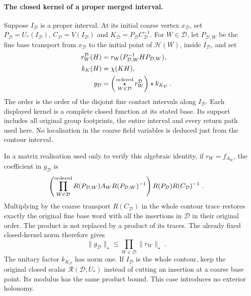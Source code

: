 \documentclass[11pt]{article}
\begin{document}
\paragraph{The closed kernel of a proper merged interval.}
Suppose $I_{\mathcal D}$ is a proper interval. At its initial
coarse vertex $x_{\mathcal D}$, set
$P_{\mathcal D}=U_*(I_{\mathcal D})$,
$C_{\mathcal D}=V(I_{\mathcal D})$ and
$K_{\mathcal D}=P_{\mathcal D}C_{\mathcal D}^{-1}$.
For $W\in\mathcal D$, let $P_{\mathcal D,W}$ be the fine base
transport from $x_{\mathcal D}$ to the initial point of
$\mathcal H(W)$, inside $I_{\mathcal D}$, and set
\begin{equation}\label{eq:c8-fourth-merged-kernel}
    \begin{aligned}
        r_W^{\mathcal D}(H)
            &=r_W(P_{\mathcal D,W}^{-1}HP_{\mathcal D,W}),\\
        k_K(H)&=\chi(KH),\\
        g_{\mathcal D}
            &=\left(\mathop{\star}_{W\in\mathcal D}^{\rm ordered}
                    r_W^{\mathcal D}\right)\star k_{K_{\mathcal D}}\;.
    \end{aligned}
\end{equation}
The order is the order of the disjoint fine contact intervals
along $I_{\mathcal D}$. Each displayed kernel is a complete
closed function at its stated base. Its support includes all
original group footprints, the entire interval and every return
path used here. No localisation in the coarse field variables
is deduced just from the contour interval.

In a matrix realisation used only to verify this algebraic
identity, if $r_W=f_{A_W}$, the coefficient in
$g_{\mathcal D}$ is
\begin{equation}\label{eq:c8-fourth-merged-word}
    \left(\prod_{W\in\mathcal D}^{\rm ordered}
        R(P_{\mathcal D,W})A_WR(P_{\mathcal D,W})^{-1}\right)
        R(P_{\mathcal D})R(C_{\mathcal D})^{-1}\;.
\end{equation}
Multiplying by the coarse transport $R(C_{\mathcal D})$ in the
whole contour trace restores exactly the original fine base
word with all the insertions in $\mathcal D$ in their original
order. The product is not replaced by a product of its traces.
The already fixed closed-kernel norm therefore gives
\begin{equation}\label{eq:c8-fourth-merged-norm}
    \|g_{\mathcal D}\|_\star
        \leq\prod_{W\in\mathcal D}\|r_W\|_\star\;.
\end{equation}
The unitary factor $k_{K_{\mathcal D}}$ has norm one. If
$I_{\mathcal D}$ is the whole contour, keep the original
closed scalar $\mathcal R(\mathcal D;U_*)$ instead of cutting
an insertion at a coarse base point. Its modulus has the same
product bound. This case introduces no exterior holonomy.
\end{document}

